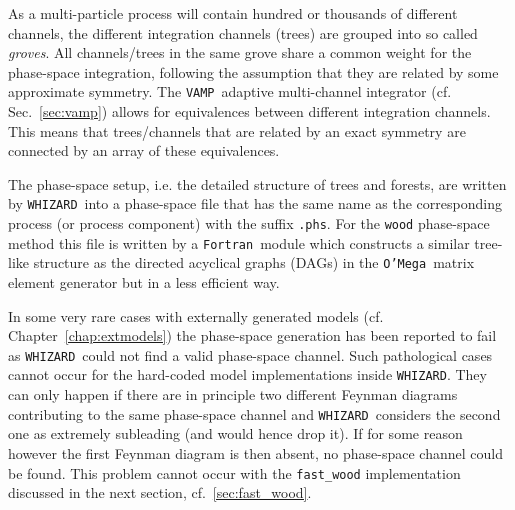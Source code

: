 \documentclass[12pt]{book}
\newcommand{\ttt}[1]{\texttt{#1}}
\newcommand{\whizard}{\ttt{WHIZARD}}
\newcommand{\oMega}{\ttt{O'Mega}}
\newcommand{\vamp}{\ttt{VAMP}}
\newcommand{\fortran}{\ttt{Fortran}}
\begin{document}
As a multi-particle process will contain hundred or thousands of
different channels, the different integration channels (trees) are
grouped into so called {\em groves}. All channels/trees in the same
grove share a common weight for the phase-space integration, following
the assumption that they are related by some approximate symmetry. The
\vamp\ adaptive multi-channel integrator (cf. Sec.~\ref{sec:vamp})
allows for equivalences between different integration channels. This
means that trees/channels that are related by an exact symmetry are
connected by an array of these equivalences.

The phase-space setup, i.e. the detailed structure of trees and
forests, are written by \whizard\ into a phase-space file that has the
same name as the corresponding process (or process component) with the
suffix \ttt{.phs}. For the \ttt{wood} phase-space method this file is
written by a \fortran\ module which constructs a similar tree-like
structure as the directed acyclical graphs (DAGs) in the
\oMega\ matrix element generator but in a less efficient way.

In some very rare cases with externally generated models
(cf. Chapter~\ref{chap:extmodels}) the phase-space generation has been
reported to fail as \whizard\ could not find a valid phase-space
channel. Such pathological cases cannot occur for the hard-coded model
implementations inside \whizard. They can only happen if there are in
principle two different Feynman diagrams contributing to the same
phase-space channel and \whizard\ considers the second one as
extremely subleading (and would hence drop it). If for some reason
however the first Feynman diagram is then absent, no phase-space
channel could be found. This problem cannot occur with the
\ttt{fast\_wood} implementation discussed in the next section,
cf.~\ref{sec:fast_wood}.
\end{document}
